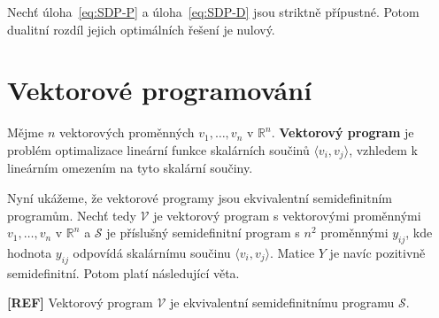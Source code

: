 \begin{vt2}
    Nechť úloha~\ref{eq:SDP-P} a úloha~\ref{eq:SDP-D} jsou striktně přípustné. Potom dualitní rozdíl jejich optimálních řešení je nulový.
\end{vt2}


\section{Vektorové programování}

Mějme $n$ vektorových proměnných $v_1, \dots, v_n$ v $\mathbb{R}^n$. \textbf{Vektorový program} je problém optimalizace lineární funkce skalárních součinů $\langle v_i, v_j \rangle$, vzhledem k lineárním omezením na tyto skalární součiny.

Nyní ukážeme, že vektorové programy jsou ekvivalentní semidefinitním programům. Nechť tedy $\mathcal{V}$ je vektorový program s vektorovými proměnnými $v_1, \dots, v_n$ v $\mathbb{R}^n$ a $\mathcal{S}$ je příslušný semidefinitní program s $n^2$ proměnnými $y_{ij}$, kde hodnota $y_{ij}$ odpovídá skalárnímu součinu $\langle v_i, v_j \rangle$. Matice $Y$ je navíc pozitivně semidefinitní. Potom platí následující věta.

\begin{vt2}\textbf{[REF]}
    Vektorový program $\mathcal{V}$ je ekvivalentní semidefinitnímu programu $\mathcal{S}$.
\end{vt2}
